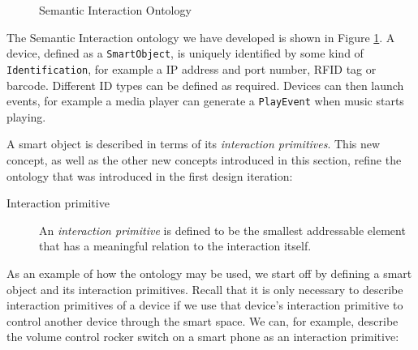 

\begin{figure}[bth]
	\centerline{
	}
	\caption{Semantic Interaction Ontology}
	\label{semanticInteractionOntology}
\end{figure}


The Semantic Interaction ontology we have developed is shown in Figure \ref{semanticInteractionOntology}.  A device, defined as a \texttt{SmartObject}, is uniquely identified by some kind of \texttt{Identification}, for example a IP address and port number, \ac{RFID} tag or barcode.  Different ID types can be defined as required. Devices can then launch events, for example a media player can generate a \texttt{PlayEvent} when music starts playing.


A smart object is described in terms of its \emph{interaction primitives}. This new concept, as well as the other new concepts introduced in this section, refine the ontology that was introduced in the first design iteration:


\begin{description}
	\item [Interaction primitive]An \emph{interaction primitive} is defined to be the smallest addressable element that has a meaningful relation to the interaction itself. 
\end{description}

As an example of how the ontology may be used, we start off by defining a smart object and its interaction primitives. Recall that it is only necessary to describe interaction primitives of a device if we use that device's interaction primitive to control another device through the smart space. We can, for example, describe the volume control rocker switch on a smart phone as an interaction primitive:

